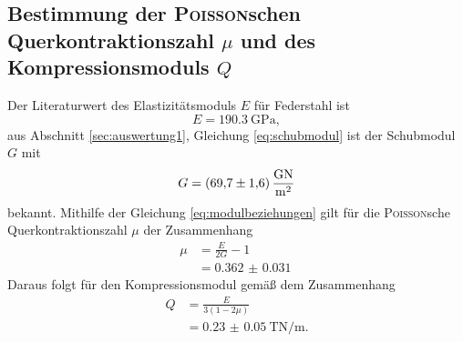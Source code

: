 \subsection{Bestimmung der \texorpdfstring{\textsc{Poisson}schen Querkontraktionszahl $\mu$}{Poissonschen Querkontraktionszahl} und des Kompressionsmoduls \texorpdfstring{$Q$}{Q}}
\label{sec:auswertung4}
Der Literaturwert des Elastizitätsmoduls $E$ für Federstahl ist
\begin{equation}
	E = \SI{190,3}{\giga\pascal},
\end{equation}
aus Abschnitt \ref{sec:auswertung1}, Gleichung \eqref{eq:schubmodul} ist der Schubmodul $G$ mit
\begin{equation}
	G=	\SI{69.7\pm1.6}{\giga\newton\per\meter\squared}
\end{equation}
bekannt.
Mithilfe der Gleichung \eqref{eq:modulbeziehungen} gilt für die \textsc{Poisson}sche Querkontraktionszahl $\mu$ der Zusammenhang
\begin{align}
	\mu &= \frac{E}{2G}-1\\
		&= \SI{0.362(31)}{}
	\label{eq:mu}
\end{align}
Daraus folgt für den Kompressionsmodul gemäß dem Zusammenhang
\begin{align} 
	Q 	&= \frac{E}{3(1-2\mu)}\\
		&= \SI{0.23(5)}{\tera\newton\per\meter}.
	\label{eq:Q}
\end{align}
